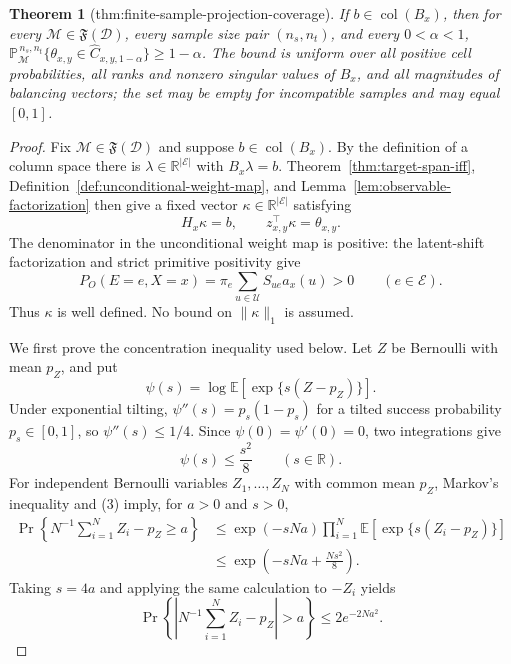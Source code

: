 \documentclass{article}
\newtheorem{theorem}{Theorem}
\begin{document}
\begin{theorem}[thm:finite-sample-projection-coverage]\label{thm:finite-sample-projection-coverage}
If \(b\in\operatorname{col}(B_x)\), then for every \(\mathcal M\in\mathfrak F(\mathcal D)\), every sample size pair \((n_s,n_t)\), and every \(0<\alpha<1\), \(\mathbb P_{\mathcal M}^{\,n_s,n_t}\{\theta_{x,y}\in\widehat C_{x,y,1-\alpha}\}\ge1-\alpha\). The bound is uniform over all positive cell probabilities, all ranks and nonzero singular values of \(B_x\), and all magnitudes of balancing vectors; the set may be empty for incompatible samples and may equal \([0,1]\).
\end{theorem}
\begin{proof}
Fix \(\mathcal M\in\mathfrak F(\mathcal D)\) and suppose \(b\in\operatorname{col}(B_x)\). By the definition of a column space there is \(\lambda\in\mathbb R^{\lvert\mathcal E\rvert}\) with \(B_x\lambda=b\). Theorem~\ref{thm:target-span-iff}, Definition~\ref{def:unconditional-weight-map}, and Lemma~\ref{lem:observable-factorization} then give a fixed vector \(\kappa\in\mathbb R^{\lvert\mathcal E\rvert}\) satisfying
\[
H_x\kappa=b,
\qquad
z_{x,y}^{\top}\kappa=\theta_{x,y}.
\tag{1}
\]
The denominator in the unconditional weight map is positive: the latent-shift factorization and strict primitive positivity give
\[
P_O(E=e,X=x)=\pi_e\sum_{u\in\mathcal U}S_{ue}a_x(u)>0
\qquad(e\in\mathcal E).
\tag{2}
\]
Thus \(\kappa\) is well defined. No bound on \(\lVert\kappa\rVert_1\) is assumed.

We first prove the concentration inequality used below. Let \(Z\) be Bernoulli with mean \(p_Z\), and put
\[
\psi(s)=\log\mathbb E\!\left[\exp\{s(Z-p_Z)\}\right].
\]
Under exponential tilting, \(\psi''(s)=p_s(1-p_s)\) for a tilted success probability \(p_s\in[0,1]\), so \(\psi''(s)\le1/4\). Since \(\psi(0)=\psi'(0)=0\), two integrations give
\[
\psi(s)\le \frac{s^2}{8}
\qquad(s\in\mathbb R).
\tag{3}
\]
For independent Bernoulli variables \(Z_1,\ldots,Z_N\) with common mean \(p_Z\), Markov's inequality and (3) imply, for \(a>0\) and \(s>0\),
\[
\begin{aligned}
\Pr\!\left\{N^{-1}\sum_{i=1}^N Z_i-p_Z\ge a\right\}
&\le \exp(-sNa)\prod_{i=1}^N
 \mathbb E\!\left[\exp\{s(Z_i-p_Z)\}\right]\\
&\le \exp\!\left(-sNa+\frac{Ns^2}{8}\right).
\end{aligned}
\tag{4}
\]
Taking \(s=4a\) and applying the same calculation to \(-Z_i\) yields
\[
\Pr\!\left\{\left|N^{-1}\sum_{i=1}^N Z_i-p_Z\right|>a\right\}
\le 2e^{-2Na^2}.
\tag{5}
\]


\end{proof}
\end{document}
